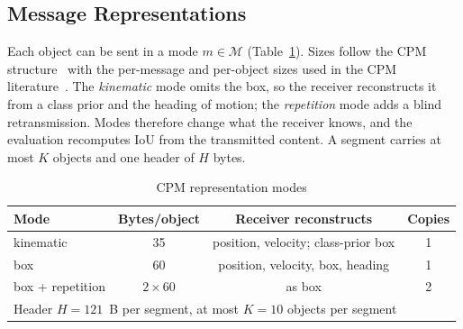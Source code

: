 \documentclass[journal]{IEEEtran}
\theoremstyle{remark}
\begin{document}
\subsection{Message Representations}
Each object can be sent in a mode $m\in\mathcal M$ (Table~\ref{tab:modes}). Sizes follow the CPM structure~\cite{etsi103324} with the per-message and per-object sizes used in the CPM literature~\cite{thandavarayan2020generation}. The \emph{kinematic} mode omits the box, so the receiver reconstructs it from a class prior and the heading of motion; the \emph{repetition} mode adds a blind retransmission. Modes therefore change what the receiver knows, and the evaluation recomputes IoU from the transmitted content. A segment carries at most $K$ objects and one header of $H$ bytes.

\begin{table}[t]
\caption{CPM representation modes}\label{tab:modes}\centering\scriptsize
\begin{tabular}{lccc}
\toprule
Mode & Bytes/object & Receiver reconstructs & Copies \\
\midrule
kinematic & 35 & position, velocity; class-prior box & 1\\
box & 60 & position, velocity, box, heading & 1\\
box + repetition & $2\times60$ & as box & 2\\
\midrule
\multicolumn{4}{l}{Header $H=121$~B per segment, at most $K=10$ objects per segment}\\
\bottomrule
\end{tabular}
\end{table}
\end{document}
